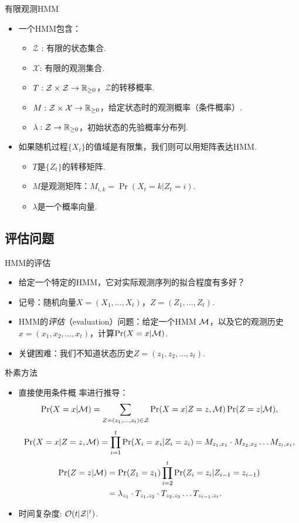 {有限观测HMM}
\begin{itemize}
    \item 一个HMM包含：
    \begin{itemize}
        \item $\mathcal Z$
        : 有限的状态集合.
        \item $\mathcal X$: 有限的观测集合.
        \item $T: \mathcal Z\times\mathcal Z\to \mathbb{R}_{\geq 0}$，$\mathcal Z$的转移概率.
        \item $M:\mathcal Z\times \mathcal X\to \mathbb{R}_{\geq 0}$，给定状态时的观测概率（条件概率）.
        \item $\lambda:\mathcal Z\to\mathbb{R}_{\geq 0}$，初始状态的先验概率分布列.
    \end{itemize}
    \item 如果随机过程$\{X_t\}$的值域是有限集，我们则可以用矩阵表达HMM.
    \begin{itemize}
    \item $T$是$\{Z_t\}$的转移矩阵.
    \item $M$是观测矩阵：$M_{i,k} = \Pr(X_t=k|Z_t=i)$.
    \item $\lambda$是一个概率向量.
    \end{itemize}
\end{itemize}


\subsection{评估问题}
{HMM的评估}
\begin{itemize}
   \item 给定一个特定的HMM，它对实际观测序列的拟合程度有多好？
   \item 记号：随机向量$X=(X_1,\dots,X_t)$，$Z=(Z_1,\dots,Z_t)$.
   \item  HMM的\emph{评估}（evaluation）问题：给定一个HMM $\mathcal M$，以及它的观测历史$x=(x_1,x_2,\dots,x_t)$，计算$\Pr(X=x|\mathcal M)$.
   \item 关键困难：我们不知道状态历史$Z=(z_1,z_2,\dots,z_t)$.
\end{itemize}


{朴素方法}
    \begin{itemize}
    \item 直接使用条件概 率进行推导：
    \[
        \Pr(X=x|\mathcal M) =\sum_{Z=(z_1, \dots, z_t) \in \mathcal Z} \Pr(X=x|Z=z, \mathcal M)\Pr(Z=z|\mathcal M),
    \]
    \[
        \Pr(X=x|Z=z,\mathcal M) = \prod_{i=1}^t \Pr(X_i = x_i| Z_i = z_i) = M_{z_1,x_1}\cdot M_{z_2,x_2}\dots M_{z_t,x_t},
    \]
    \begin{align*}
        \Pr(Z=z|\mathcal M) &= \Pr(Z_1 = z_1) \prod_{i=2}^t\Pr(Z_i = z_i| Z_{i-1} = z_{i-1}) 
        \\
        &= \lambda_{z_1}\cdot T_{z_1,z_2}\cdot T_{z_2,z_3}\dots T_{z_{t-1},z_t}.
    \end{align*}
    \item 时间复杂度: $\mathcal{O}(t|\mathcal Z|^t)$.
    \end{itemize}


